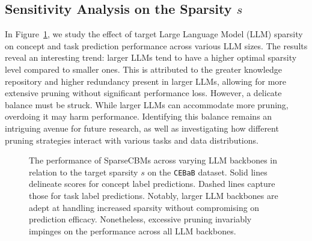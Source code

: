 \documentclass[letterpaper]{article} %
\begin{document}
\subsection{Sensitivity Analysis on the Sparsity $s$}
In Figure~\ref{fig:logit_0}, we study the effect of target Large Language Model (LLM) sparsity on concept and task prediction performance across various LLM sizes. The results reveal an interesting trend: larger LLMs tend to have a higher optimal sparsity level compared to smaller ones. This is attributed to the greater knowledge repository and higher redundancy present in larger LLMs, allowing for more extensive pruning without significant performance loss.
However, a delicate balance must be struck. While larger LLMs can accommodate more pruning, overdoing it may harm performance. Identifying this balance remains an intriguing avenue for future research, as well as investigating how different pruning strategies interact with various tasks and data distributions.
\begin{figure}[t]
  \caption{The performance of SparseCBMs across varying LLM backbones in relation to the target sparsity $s$ on the \texttt{CEBaB} dataset. Solid lines delineate scores for concept label predictions. Dashed lines capture those for task label predictions. Notably, larger LLM backbones are adept at handling increased sparsity without compromising on prediction efficacy. Nonetheless, excessive pruning invariably impinges on the performance across all LLM backbones.}
  \label{fig:logit_0}
\end{figure}
\end{document}
